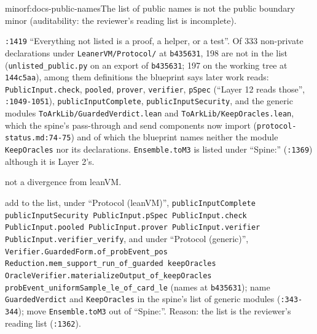 \begin{finding}{minor}{f:docs-public-names}{The list of public names is not the public boundary}
 minor (auditability: the reviewer's reading list is incomplete).
 \begin{sloppypar}
\texttt{:\allowbreak{}1419} ``Everything not listed is a proof, a helper, or a test''. Of 333 non-private declarations under \texttt{Leaner\allowbreak{}VM/\allowbreak{}Protocol/\allowbreak{}} at \texttt{b435631}, 198 are not in the list (\texttt{unlisted\_\allowbreak{}public.\allowbreak{}py} on an export of \texttt{b435631}; 197 on the working tree at \texttt{144c5aa}), among them definitions the blueprint says later work reads: \texttt{Public\allowbreak{}Input.\allowbreak{}check}, \texttt{pooled}, \texttt{prover}, \texttt{verifier}, \texttt{pSpec} (``Layer 12 reads those'', \texttt{:\allowbreak{}1049-\allowbreak{}1051}), \texttt{public\allowbreak{}Input\allowbreak{}Complete}, \texttt{public\allowbreak{}Input\allowbreak{}Security}, and the generic modules \texttt{To\allowbreak{}Ark\allowbreak{}Lib/\allowbreak{}Guarded\allowbreak{}Verdict.\allowbreak{}lean} and \texttt{To\allowbreak{}Ark\allowbreak{}Lib/\allowbreak{}Keep\allowbreak{}Oracles.\allowbreak{}lean}, which the spine's pass-through and send components now import (\texttt{protocol-\allowbreak{}status.\allowbreak{}md:\allowbreak{}74-\allowbreak{}75}) and of which the blueprint names neither the module \texttt{KeepOracles} nor its declarations. \texttt{Ensemble.\allowbreak{}toM3} is listed under ``Spine:'' (\texttt{:\allowbreak{}1369}) although it is Layer 2's.
\end{sloppypar}
 not a divergence from leanVM.
 \begin{sloppypar}
add to the list, under ``Protocol (leanVM)'', \texttt{public\allowbreak{}Input\allowbreak{}Complete public\allowbreak{}Input\allowbreak{}Security Public\allowbreak{}Input.\allowbreak{}p\allowbreak{}Spec Public\allowbreak{}Input.\allowbreak{}check Public\allowbreak{}Input.\allowbreak{}pooled Public\allowbreak{}Input.\allowbreak{}prover Public\allowbreak{}Input.\allowbreak{}verifier Public\allowbreak{}Input.\allowbreak{}verifier\_\allowbreak{}verify}, and under ``Protocol (generic)'', \texttt{Verifier.\allowbreak{}Guarded\allowbreak{}Form.\allowbreak{}of\_\allowbreak{}prob\allowbreak{}Event\_\allowbreak{}pos Reduction.\allowbreak{}mem\_\allowbreak{}support\_\allowbreak{}run\_\allowbreak{}of\_\allowbreak{}guarded keep\allowbreak{}Oracles Oracle\allowbreak{}Verifier.\allowbreak{}materialize\allowbreak{}Output\_\allowbreak{}of\_\allowbreak{}keep\allowbreak{}Oracles prob\allowbreak{}Event\_\allowbreak{}uniform\allowbreak{}Sample\_\allowbreak{}le\_\allowbreak{}of\_\allowbreak{}card\_\allowbreak{}le} (names at \texttt{b435631}); name \texttt{GuardedVerdict} and \texttt{KeepOracles} in the spine's list of generic modules (\texttt{:\allowbreak{}343-\allowbreak{}344}); move \texttt{Ensemble.\allowbreak{}toM3} out of ``Spine:''. Reason: the list is the reviewer's reading list (\texttt{:\allowbreak{}1362}).
\end{sloppypar}
\end{finding}


